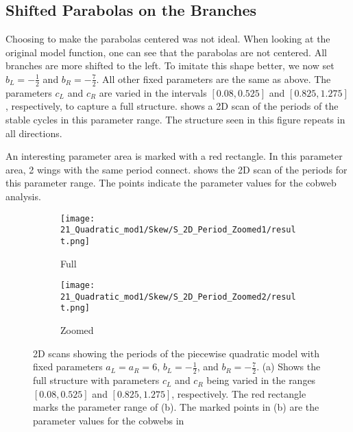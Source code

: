 \subsection{Shifted Parabolas on the Branches}
\label{sec:setup.quad.skewed}

Choosing to make the parabolas centered was not ideal.
When looking at the original model function, one can see that the parabolas are not centered.
All branches are more shifted to the left.
To imitate this shape better, we now set $b_L = -\frac{1}{2}$ and $b_R = -\frac{7}{2}$.
All other fixed parameters are the same as above.
The parameters $c_L$ and $c_R$ are varied in the intervals $[0.08, 0.525]$ and $[0.825, 1.275]$, respectively, to capture a full structure.
 shows a 2D scan of the periods of the stable cycles in this parameter range.
The structure seen in this figure repeats in all directions.

An interesting parameter area is marked with a red rectangle.
In this parameter area, 2 wings with the same period connect.
 shows the 2D scan of the periods for this parameter range.
The points indicate the parameter values for the cobweb analysis.

\begin{figure}
	\centering
	\begin{subfigure}{0.4\textwidth}
		\centering
		\texttt{[image: 21\_Quadratic\_mod1/Skew/S\_2D\_Period\_Zoomed1/result.png]}
		\caption{Full}
		\label{fig:setup.quad.skew.period.full}
	\end{subfigure}
	\begin{subfigure}{0.4\textwidth}
		\texttt{[image: 21\_Quadratic\_mod1/Skew/S\_2D\_Period\_Zoomed2/result.png]}
		\caption{Zoomed}
		\label{fig:setup.quad.skew.period.zoomed}
	\end{subfigure}
	\caption[2D scans showing periods of the skewed piecewise quadratic model]{
		2D scans showing the periods of the piecewise quadratic model with fixed parameters $a_L = a_R = 6$, $b_L = -\frac{1}{2}$, and $b_R = -\frac{7}{2}$.
		(a) Shows the full structure with parameters $c_L$ and $c_R$ being varied in the ranges $[0.08, 0.525]$ and $[0.825, 1.275]$, respectively.
		The red rectangle marks the parameter range of (b).
		The marked points in (b) are the parameter values for the cobwebs in 
	}
	\label{fig:setup.quad.skew.period}
\end{figure}

